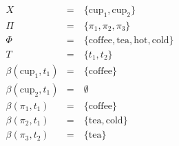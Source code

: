\begin{align*}
    &X                          &=\ &\{ \text{cup}_1, \text{cup}_2 \} \\
    &\Pi                        &=\ &\{ \pi_1, \pi_2, \pi_3 \} \\
    &\Phi                       &=\ &\{ \text{coffee}, \text{tea}, \text{hot}, \text{cold} \} \\
    &T                          &=\ &\{ t_1, t_2 \} \\
    &\beta(\text{cup}_1, t_1)   &=\ &\{ \text{coffee} \} \\
    &\beta(\text{cup}_2, t_1)   &=\ &\emptyset \\
    &\beta(\pi_1, t_1)          &=\ &\{ \text{coffee} \} \\
    &\beta(\pi_2, t_1)          &=\ &\{ \text{tea}, \text{cold} \} \\
    &\beta(\pi_3, t_2)          &=\ &\{ \text{tea} \}
\end{align*}


\cleardoublepage
